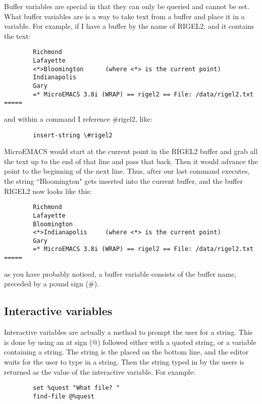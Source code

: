 Buffer variables are special in that they can only be queried
and cannot be set.  What buffer variables are is a way to take text from
a buffer and place it in a variable. For example, if I have a buffer by
the name of RIGEL2, and it contains the text:

\begin{verbatim}
        Richmond
        Lafayette
        <*>Bloomington      (where <*> is the current point)
        Indianapolis
        Gary
        =* MicroEMACS 3.8i (WRAP) == rigel2 == File: /data/rigel2.txt =====
\end{verbatim}

and within a command I reference \#rigel2, like:

\begin{verbatim}
        insert-string \#rigel2
\end{verbatim}

MicroEMACS would start at the current point in the RIGEL2
buffer and grab all the text up to the end of that line and pass that
back.  Then it would advance the point to the beginning of the next line.
Thus, after our last command executes, the string ``Bloomington" gets
inserted into the current buffer, and the buffer RIGEL2 now looks like
this:

\begin{verbatim}
        Richmond
        Lafayette
        Bloomington
        <*>Indianapolis     (where <*> is the current point)
        Gary
        =* MicroEMACS 3.8i (WRAP) == rigel2 == File: /data/rigel2.txt =====
\end{verbatim}

as you have probably noticed, a buffer variable consists of the
buffer name, preceded by a pound sign (\#).

\subsection{Interactive variables}

Interactive variables are actually a method to prompt the user
for a string.  This is done by using an at sign (@) followed either with
a quoted string, or a variable containing a string.  The string is the
placed on the bottom line, and the editor waits for the user to type in
a string.  Then the string typed in by the users is returned as the
value of the interactive variable.  For example:

\begin{verbatim}
        set %quest "What file? "
        find-file @%quest
\end{verbatim}

